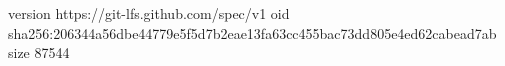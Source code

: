 version https://git-lfs.github.com/spec/v1
oid sha256:206344a56dbe44779e5f5d7b2eae13fa63cc455bac73dd805e4ed62cabead7ab
size 87544
